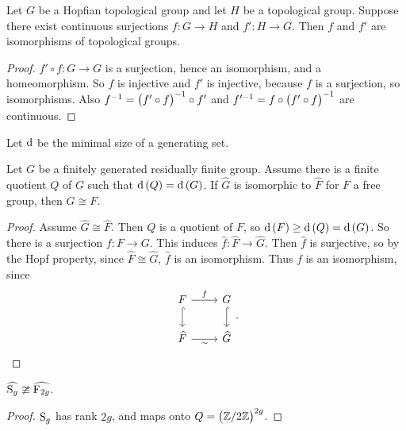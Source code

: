 \begin{proposition}
Let $ G $ be a Hopfian topological group and let $ H $ be a topological group. Suppose there exist continuous surjections $ f : G \to H $ and $ f' : H \to G $. Then $ f $ and $ f' $ are isomorphisms of topological groups.
\end{proposition}

\begin{proof}
$ f' \circ f : G \to G $ is a surjection, hence an isomorphism, and a homeomorphism. So $ f $ is injective and $ f' $ is injective, because $ f $ is a surjection, so isomorphisms. Also $ f^{-1} = \br{f' \circ f}^{-1} \circ f' $ and $ f'^{-1} = f \circ \br{f' \circ f}^{-1} $ are continuous.
\end{proof}

\pagebreak

Let $ \d $ be the minimal size of a generating set.

\begin{proposition}
Let $ G $ be a finitely generated residually finite group. Assume there is a finite quotient $ Q $ of $ G $ such that $ \d\br{Q} = \d\br{G} $. If $ \widehat{G} $ is isomorphic to $ \widehat{F} $ for $ F $ a free group, then $ G \cong F $.
\end{proposition}

\begin{proof}
Assume $ \widehat{G} \cong \widehat{F} $. Then $ Q $ is a quotient of $ F $, so $ \d\br{F} \ge \d\br{Q} = \d\br{G} $. So there is a surjection $ f : F \to G $. This induces $ \widehat{f} : \widehat{F} \to \widehat{G} $. Then $ \widehat{f} $ is surjective, so by the Hopf property, since $ \widehat{F} \cong \widehat{G} $, $ \widehat{f} $ is an isomorphism. Thus $ f $ is an isomorphism, since
$$
\begin{tikzcd}
F \arrow{r}{f} \arrow[hookrightarrow]{d} & G \arrow[hookrightarrow]{d} \\
\widehat{F} \arrow{r}[swap]{\sim} & \widehat{G}
\end{tikzcd}.
$$
\end{proof}

\begin{corollary}
$ \widehat{\S_g} \ncong \widehat{\F_{2g}} $.
\end{corollary}

\begin{proof}
$ \S_g $ has rank $ 2g $, and maps onto $ Q = \br{\ZZ / 2\ZZ}^{2g} $.
\end{proof}

